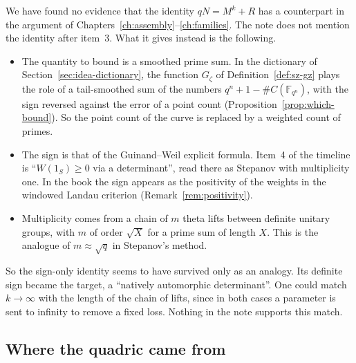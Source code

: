 \documentclass[11pt]{amsbook}
\theoremstyle{plain}
\theoremstyle{definition}
\theoremstyle{remark}
\numberwithin{equation}{section}
\numberwithin{figure}{chapter}
\numberwithin{table}{chapter}
\newcommand{\F}{\mathbb{F}}
\newcommand{\Gz}{G_{\zeta}}
\begin{document}
We have found no evidence that the identity $qN=M^k+R$ has a
counterpart in the argument of
Chapters~\ref{ch:assembly}--\ref{ch:families}. The note does not mention the
identity
after item~3. What it gives instead is the following.
\begin{itemize}
\item The quantity to bound is a smoothed prime sum. In the
  dictionary of Section~\ref{sec:idea-dictionary}, the function
  $\Gz$ of Definition~\ref{def:sz-gz} plays the role of a
  tail-smoothed sum of the numbers $q^n + 1 - \#C(\F_{q^n})$, with
  the sign reversed against the error of a point count
  (Proposition~\ref{prop:which-bound}). So the point count of the
  curve is replaced by a weighted count of primes.
\item The sign is that of the Guinand--Weil explicit formula.
  Item~4 of the timeline is ``$W(1_S) \ge 0$ via a determinant'',
  read there as Stepanov with multiplicity one. In the book the
  sign appears as the positivity of the weights in the windowed
  Landau criterion (Remark~\ref{rem:positivity}).
\item Multiplicity comes from a chain of $m$ theta lifts between
  definite unitary groups, with $m$ of order $\sqrt X$ for a prime
  sum of length $X$. This is the analogue of $m \approx \sqrt q$ in
  Stepanov's method.
\end{itemize}
So the sign-only identity seems to have survived only as an
analogy. Its definite sign became the target, a ``natively
automorphic determinant''. One could match $k \to \infty$ with the
length of the chain of lifts, since in both cases a parameter is
sent to infinity to remove a fixed loss. Nothing in the note
supports this match.

\subsection{Where the quadric came from}
\end{document}
